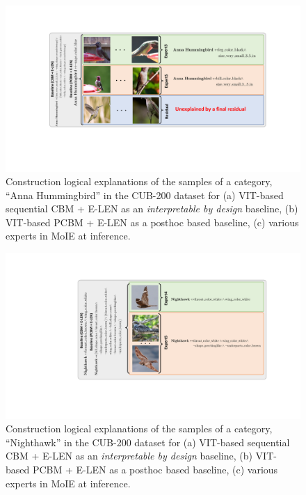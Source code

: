 \begin{figure}[h]
\centering
\includegraphics[width=1 \linewidth]{figures/Supp/Anna_hummingbird.pdf}
\vspace{-10pt}
\caption{Construction logical explanations of the samples of a category, ``Anna Hummingbird'' in the CUB-200 dataset for (a) VIT-based sequential CBM + E-LEN as an \emph{interpretable by design} baseline, (b) VIT-based PCBM + E-LEN as a posthoc based baseline, (c) various experts in MoIE at inference.}
\label{fig:local_ex_anna}
\vspace{-2.5pt}
\end{figure}

\begin{figure}[h]
\centering
\includegraphics[width=1 \linewidth]{figures/Supp/Nighthawk.pdf}
\vspace{-10pt}
\caption{Construction logical explanations of the samples of a category, ``Nighthawk'' in the CUB-200 dataset for (a) VIT-based sequential CBM + E-LEN as an \emph{interpretable by design} baseline, (b) VIT-based PCBM + E-LEN as a posthoc based baseline, (c) various experts in MoIE at inference. }
\label{fig:local_ex_nighthawk}
\vspace{-2.5pt}
\end{figure}


